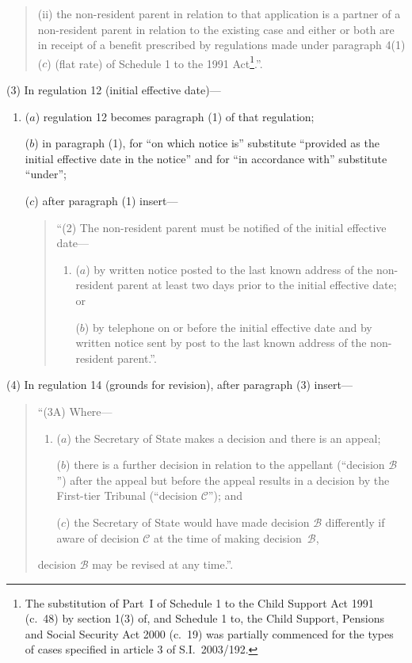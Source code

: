 \documentclass[12pt,a4paper]{article}
\begin{document}
\begin{enumerate}
\begin{quotation}
\begin{enumerate}
\begin{enumerate}
(ii) the non-resident parent in relation to that application is a partner of a non-resident parent in relation to the existing case and either or both are in receipt of a benefit prescribed by regulations made under paragraph 4(1)($c$)  (flat rate) of Schedule 1 to the 1991 Act\footnote{The substitution of Part~I of Schedule 1 to the Child Support Act 1991 (c.~48) by section 1(3) of, and Schedule 1 to, the Child Support, Pensions and Social Security Act 2000 (c.~19) was partially commenced for the types of cases specified in article 3 of S.I.~2003/192.}.”.
\end{enumerate}
\end{enumerate}
\end{quotation}
\end{enumerate}

(3) In regulation 12 (initial effective date)—
\begin{enumerate}\item[]
($a$) regulation 12 becomes paragraph (1) of that regulation;

($b$) in paragraph (1), for “on which notice is” substitute “provided as the initial effective date in the notice” and for “in accordance with” substitute “under”;

($c$) after paragraph (1) insert—
\begin{quotation}
“(2) The non-resident parent must be notified of the initial effective date—
\begin{enumerate}\item[]
($a$) by written notice posted to the last known address of the non-resident parent at least two days prior to the initial effective date; or

($b$) by telephone on or before the initial effective date and by written notice sent by post to the last known address of the non-resident parent.”.
\end{enumerate}
\end{quotation}
\end{enumerate}

(4) In regulation 14 (grounds for revision), after paragraph (3) insert—
\begin{quotation}
“(3A) Where—
\begin{enumerate}\item[]
($a$) the Secretary of State makes a decision and there is an appeal;

($b$) there is a further decision in relation to the appellant (“decision $\mathcal{B}$”) after the appeal but before the appeal results in a decision by the First-tier Tribunal (“decision $\mathcal{C}$”); and

($c$) the Secretary of State would have made decision $\mathcal{B}$ differently if aware of decision $\mathcal{C}$ at the time of making decision~$\mathcal{B}$,
\end{enumerate}
decision $\mathcal{B}$ may be revised at any time.”.
\end{quotation}
\end{document}
